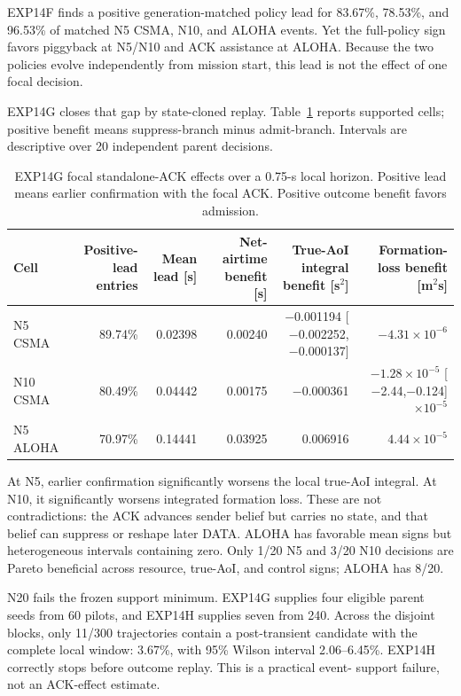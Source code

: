 EXP14F finds a positive generation-matched policy lead for 83.67\%, 78.53\%,
and 96.53\% of matched N5 CSMA, N10, and ALOHA events. Yet the full-policy
sign favors piggyback at N5/N10 and ACK assistance at ALOHA. Because the two
policies evolve independently from mission start, this lead is not the effect
of one focal decision.

EXP14G closes that gap by state-cloned replay. Table~\ref{tab:s2-branch}
reports supported cells; positive benefit means suppress-branch minus
admit-branch. Intervals are descriptive over 20 independent parent decisions.

\begin{table}[t]
\centering
\caption{EXP14G focal standalone-ACK effects over a 0.75-s local horizon.
Positive lead means earlier confirmation with the focal ACK. Positive outcome
benefit favors admission.}
\label{tab:s2-branch}
\scriptsize
\begin{tabular}{lrrrrr}
\toprule
Cell & Positive-lead entries & Mean lead [s] & Net-airtime benefit [s] &
True-AoI integral benefit [s$^2$] & Formation-loss benefit [m$^2$s] \\
\midrule
N5 CSMA & 89.74\% & 0.02398 & 0.00240 &
$-$0.001194 [$-$0.002252,$-$0.000137] & $-4.31\times10^{-6}$ \\
N10 CSMA & 80.49\% & 0.04442 & 0.00175 &
$-$0.000361 & $-1.28\times10^{-5}$ [$-$2.44,$-$0.124]$\times10^{-5}$ \\
N5 ALOHA & 70.97\% & 0.14441 & 0.03925 &
0.006916 & $4.44\times10^{-5}$ \\
\bottomrule
\end{tabular}
\end{table}

At N5, earlier confirmation significantly worsens the local true-AoI
integral. At N10, it significantly worsens integrated formation loss. These
are not contradictions: the ACK advances sender belief but carries no state,
and that belief can suppress or reshape later DATA. ALOHA has favorable mean
signs but heterogeneous intervals containing zero. Only 1/20 N5 and 3/20 N10
decisions are Pareto beneficial across resource, true-AoI, and control signs;
ALOHA has 8/20.

N20 fails the frozen support minimum. EXP14G supplies four eligible parent
seeds from 60 pilots, and EXP14H supplies seven from 240. Across the disjoint
blocks, only 11/300 trajectories contain a post-transient candidate with the
complete local window: 3.67\%, with 95\% Wilson interval 2.06--6.45\%.
EXP14H correctly stops before outcome replay. This is a practical event-
support failure, not an ACK-effect estimate.

